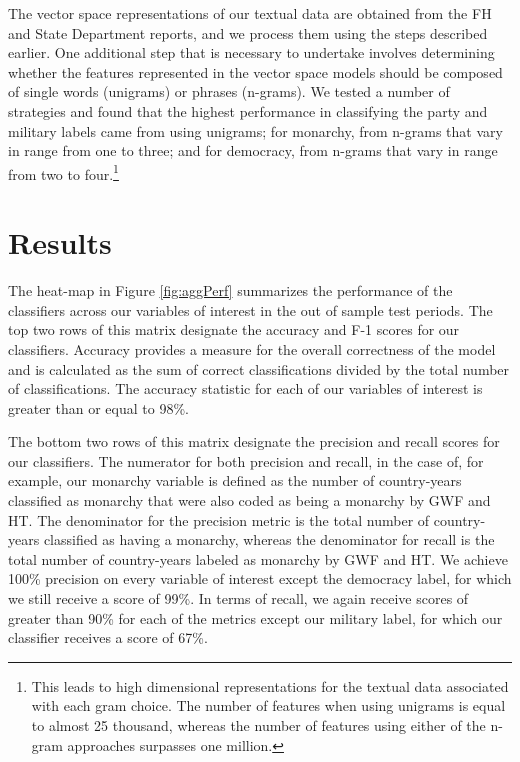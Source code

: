 \documentclass[pdftex,12pt,fullpage,oneside]{amsart}
\begin{document}
The vector space representations of our textual data are obtained from the FH and State Department reports, and we process them using the steps described earlier. One additional step that is necessary to undertake involves determining whether the features represented in the vector space models should be composed of single words (unigrams) or phrases (n-grams). We tested a number of strategies and found that the highest performance in classifying the party and military labels came from using unigrams; for monarchy, from n-grams that vary in range from one to three; and for democracy, from n-grams that vary in range from two to four.\footnote{This leads to high dimensional representations for the textual data associated with each gram choice. The number of features when using unigrams is equal to almost 25 thousand, whereas the number of features using either of the n-gram approaches surpasses one million.}

\section{Results}

The heat-map in Figure \ref{fig:aggPerf} summarizes the performance of the classifiers across our variables of interest in the out of sample test periods. The top two rows of this matrix designate the accuracy and F-1 scores for our classifiers. Accuracy provides a measure for the overall correctness of the model and is calculated as the sum of correct classifications divided by the total number of classifications. The accuracy statistic for each of our variables of interest is greater than or equal to 98\%. 

The bottom two rows of this matrix designate the precision and recall scores for our classifiers. The numerator for both precision and recall, in the case of, for example, our monarchy variable is defined as the number of country-years classified as monarchy that were also coded as being a monarchy by GWF and HT. The denominator for the precision metric is the total number of country-years classified as having a monarchy, whereas the denominator for recall is the total number of country-years labeled as monarchy by GWF and HT. We achieve 100\% precision on every variable of interest except the democracy label, for which we still receive a score of 99\%. In terms of recall, we again receive scores of greater than 90\% for each of the metrics except our military label, for which our classifier receives a score of 67\%. 
\end{document}
